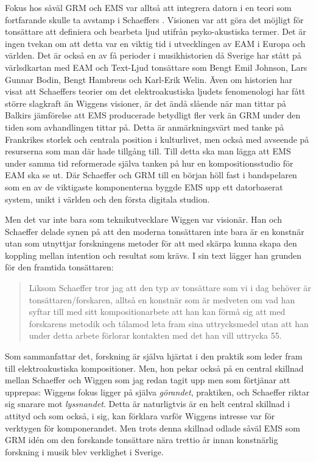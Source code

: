 \documentclass[11pt]{article}
\begin{document}
Fokus hos såväl GRM och EMS var alltså att integrera datorn i en teori som fortfarande skulle ta avstamp i Schaeffers . Visionen var att göra det möjligt för tonsättare att definiera och bearbeta ljud utifrån psyko-akustiska termer. Det är ingen tvekan om att detta var en viktig tid i utvecklingen av EAM i Europa och världen. Det är också en av få perioder i musikhistorien då Sverige har stått på värlsdkartan med EAM och Text-Ljud tonsättare som Bengt Emil Johnson, Lars Gunnar Bodin, Bengt Hambreus och Karl-Erik Welin. Även om historien har visat att Schaeffers teorier om det elektroakustiska ljudets fenomenologi har fått större slagkraft än Wiggens visioner, är det ändå slående när man tittar på Balkirs jämförelse att EMS producerade betydligt fler verk än GRM under den tiden som avhandlingen tittar på. Detta är anmärkningsvärt med tanke på Frankrikes storlek och centrala position i kulturlivet, men också med avseende på resurserna som man där hade tillgång till. Till detta ska man lägga att EMS under samma tid reformerade själva tanken på hur en kompositionsstudio för EAM ska se ut. Där Schaeffer och GRM till en början höll fast i bandspelaren som en av de viktigaste komponenterna byggde EMS upp ett datorbaserat system, unikt i världen och den första digitala studion.

Men det var inte bara som teknikutvecklare Wiggen var visionär. Han och Schaeffer delade synen på att den moderna tonsättaren inte bara är en konstnär utan som utnyttjar forskningens metoder för att med skärpa kunna skapa den koppling mellan intention och resultat som krävs. I sin text  lägger han grunden för den framtida tonsättaren:

\begin{quote}
Liksom Schaeffer tror jag att den typ av tonsättare som vi i dag behöver är tonsättaren/forskaren, alltså en konstnär som är medveten om vad han syftar till med sitt kompositionarbete att han kan förmå sig att med forskarens metodik och tålamod leta fram sina uttrycksmedel utan att han under detta arbete förlorar kontakten med det han vill uttrycka 55. \citep[s. 124, citerad i Balkir (2018), s. 54]{wiggen1972}
\end{quote}

Som \citet[s. 53]{Balkir2018} sammanfattar det, forskning är själva hjärtat i den praktik som leder fram till elektroakustiska kompositioner. Men, hon pekar också på en central skillnad mellan Schaeffer och Wiggen som jag redan tagit upp men som förtjänar att upprepas: Wiggens fokus ligger på själva \emph{görandet}, praktiken, och Schaeffer riktar sig snarare mot \emph{lyssnandet}. Detta är naturligtvis är en helt central skillnad i attityd och som också, i sig, kan förklara varför Wiggens intresse var för verktygen för komponerandet. Men trots denna skillnad odlade såväl EMS som GRM idén om den forskande tonsättare nära trettio år innan konstnärlig forskning i musik blev verklighet i Sverige.
\end{document}
